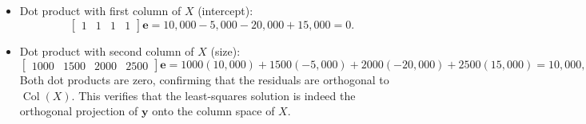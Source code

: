 \documentclass{article}
\begin{document}
\begin{itemize}
\item Dot product with first column of $X$ (intercept):
    \[
    \begin{bmatrix} 1 & 1 & 1 & 1 \end{bmatrix} \mathbf{e}
    = 10{,}000 - 5{,}000 - 20{,}000 + 15{,}000 = 0.
    \]

    \item Dot product with second column of $X$ (size):
    \[
    \begin{bmatrix} 1000 & 1500 & 2000 & 2500 \end{bmatrix} 
    \mathbf{e}
    = 1000(10{,}000) + 1500(-5{,}000) + 2000(-20{,}000) + 2500(15{,}000)
    = 10{,}000{,}000 - 7{,}500{,}000 - 40{,}000{,}000 + 37{,}500{,}000 = 0.
\]
Both dot products are zero, confirming that the residuals are orthogonal to $\operatorname{Col}(X)$. This verifies that the least-squares solution is indeed the orthogonal projection of $\mathbf{y}$ onto the column space of $X$.
\end{itemize}
\end{document}
